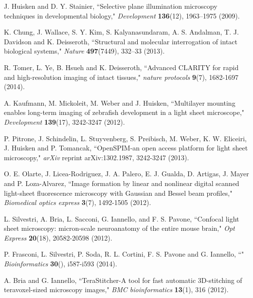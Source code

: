 \documentclass[12pt]{spieman}  %
\begin{document}
\begin{thebibliography}{0}

 J. Huisken and D. Y. Stainier, ``Selective plane illumination microscopy techniques in developmental biology," \emph{Development} \textbf{136}(12), 1963–1975 (2009).

 K. Chung, J. Wallace, S. Y. Kim, S. Kalyanasundaram, A. S. Andalman, T. J. Davidson and K. Deisseroth, ``Structural and molecular interrogation of intact biological systems," \emph{Nature} \textbf{497}(7449), 332–33 (2013).

 R. Tomer, L. Ye, B. Hsueh and K. Deisseroth, ``Advanced CLARITY for rapid and high-resolution imaging of intact tissues," \emph{nature protocols} \textbf{9}(7), 1682-1697 (2014).

 A. Kaufmann, M. Mickoleit, M. Weber and J. Huisken, ``Multilayer mounting enables long-term imaging of zebrafish development in a light sheet microscope," \emph{Development} \textbf{139}(17), 3242-3247 (2012).

 P. Pitrone, J. Schindelin, L. Stuyvenberg, S. Preibisch, M. Weber, K. W. Eliceiri, J. Huisken and P. Tomancak, ``OpenSPIM-an open access platform for light sheet microscopy," \emph{arXiv} reprint arXiv:1302.1987, 3242-3247 (2013).

 O. E. Olarte, J. Licea-Rodriguez, J. A. Palero, E. J. Gualda, D. Artigas, J. Mayer and P. Loza-Alvarez, ``Image formation by linear and nonlinear digital scanned light-sheet fluorescence microscopy with Gaussian and Bessel beam profiles," \emph{Biomedical optics express} \textbf{3}(7), 1492-1505 (2012).

 L. Silvestri, A. Bria, L. Sacconi, G. Iannello,  and F. S. Pavone,  ``Confocal light sheet microscopy: micron-scale neuroanatomy of the entire mouse brain," \emph{Opt Express} \textbf{20}(18), 20582-20598 (2012).

 P. Frasconi, L. Silvestri, P. Soda, R. L. Cortini, F. S. Pavone and G. Iannello, ``" \emph{Bioinformatics} \textbf{30}(), i587-i593 (2014).

 A. Bria and G. Iannello,  ``TeraStitcher-A tool for fast automatic 3D-stitching of teravoxel-sized microscopy images,"  \emph{BMC bioinformatics} \textbf{13}(1), 316 (2012).

\end{thebibliography}


\listoffigures



\listoftables

\end{document}
